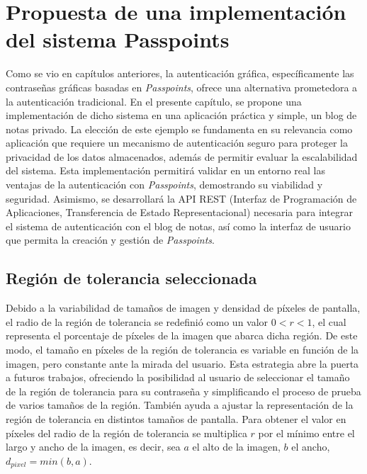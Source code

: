 \chapter{Propuesta de una implementación del sistema Passpoints}\label{chapter:proposal}
Como se vio en capítulos anteriores, la autenticación gráfica, específicamente las contraseñas gráficas basadas en \textit{Passpoints}, ofrece una alternativa prometedora a la autenticación tradicional. En el presente capítulo, se propone una implementación de dicho sistema en una aplicación práctica y simple, un blog de notas privado. La elección de este ejemplo se fundamenta en su relevancia como aplicación que requiere un mecanismo de autenticación seguro para proteger la privacidad de los datos almacenados, además de permitir evaluar la escalabilidad del sistema. Esta implementación permitirá validar en un entorno real las ventajas de la autenticación con \textit{Passpoints}, demostrando su viabilidad y seguridad. Asimismo, se desarrollará la API REST (Interfaz de Programación de Aplicaciones, Transferencia de Estado Representacional) necesaria para integrar el sistema de autenticación con el blog de notas, así como la interfaz de usuario que permita la creación y gestión de \textit{Passpoints}.



\section{Regi\'on de tolerancia seleccionada}

Debido a la variabilidad de tamaños de imagen y densidad de píxeles de pantalla, el radio de la región de tolerancia se redefinió como un valor $0 < r < 1$, el cual representa el porcentaje de píxeles de la imagen que abarca dicha región. De este modo, el tamaño en píxeles de la región de tolerancia es variable en función de la imagen, pero constante ante la mirada del usuario. Esta estrategia abre la puerta a futuros trabajos, ofreciendo la posibilidad al usuario de seleccionar el tamaño de la región de tolerancia para su contraseña y simplificando el proceso de prueba de varios tamaños de la región. Tambi\'en ayuda a ajustar la representaci\'on de la regi\'on de tolerancia en distintos tama\~nos de pantalla. Para obtener el valor en píxeles del radio de la región de tolerancia se multiplica $r$ por el mínimo entre el largo y ancho de la imagen, es decir, sea $a$ el alto de la imagen, $b$ el ancho, $d_{pixel} = min(b,a)$.

